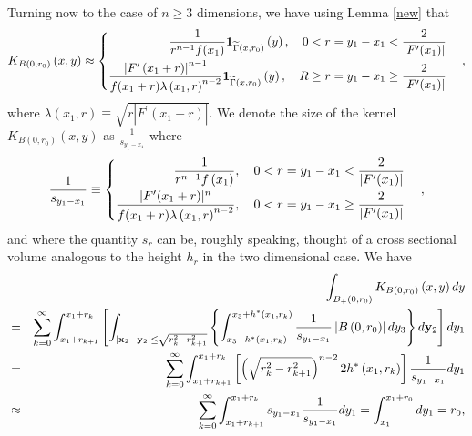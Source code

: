 \documentclass{amsart}
\theoremstyle{plain}
\numberwithin{equation}{section}
\begin{document}
Turning now to the case of $n\geq 3$ dimensions, we have using Lemma \ref{new}
that%
\begin{equation*}
K_{B\left( 0,r_{0}\right) }\left( x,y\right) \approx 
\begin{cases}
\begin{split}
\frac{1}{r^{n-1}f(x_{1})}\mathbf{1}_{\widetilde{\Gamma }\left(
	x,r_{0}\right) }\left( y\right) ,\quad 0& <r=y_{1}-x_{1}<\frac{2}{|F^{\prime
	}(x_{1})|} \\
\frac{\left\vert F^{\prime }\left( x_{1}+r\right) \right\vert ^{n-1}}{%
	f(x_{1}+r)\lambda \left( x_{1},r\right) ^{n-2}}\mathbf{1}_{\widetilde{\Gamma 
	}\left( x,r_{0}\right) }\left( y\right) ,\quad R& \geq r=y_{1}-x_{1}\geq 
\frac{2}{|F^{\prime }(x_{1})|}
\end{split}%
\end{cases}%
,
\end{equation*}%
where $\lambda \left( x_{1},r\right) \equiv \sqrt{r\left\vert F^{\prime
	}\left( x_{1}+r\right) \right\vert }$. We denote the size of the kernel $%
K_{B\left( 0,r_{0}\right) }(x,y)$ as $\frac{1}{s_{y_{1}-x_{1}}}$ where 
\begin{equation*}
\frac{1}{s_{y_{1}-x_{1}}}\equiv 
\begin{cases}
\begin{split}
\frac{1}{r^{n-1}f\left( x_{1}\right) },\quad 0& <r=y_{1}-x_{1}<\frac{2}{%
	|F^{\prime }(x_{1})|} \\
\frac{|F^{\prime }(x_{1}+r)|^{n}}{f(x_{1}+r)\lambda \left( x_{1},r\right)
	^{n-2}},\quad 0& <r=y_{1}-x_{1}\geq \frac{2}{|F^{\prime }(x_{1})|}
\end{split}%
\end{cases}%
,
\end{equation*}%
and where the quantity $s_{r}$ can be, roughly speaking, thought of a cross
sectional volume analogous to the height $h_{r}$ in the two dimensional
case. We have%
\begin{eqnarray*}
	&&\int_{B_{+}\left( 0,r_{0}\right) }K_{B\left( 0,r_{0}\right) }\left(
	x,y\right) dy \\
	&=&\sum_{k=0}^{\infty }\int_{x_{1}+r_{k+1}}^{x_{1}+r_{k}}\left[
	\int_{\left\vert \mathbf{x}_{2}-\mathbf{y}_{2}\right\vert \leq \sqrt{%
			r_{k}^{2}-r_{k+1}^{2}}}\left\{ \int_{x_{3}-h^{\ast }\left(
		x_{1},r_{k}\right) }^{x_{3}+h^{\ast }\left( x_{1},r_{k}\right) }\frac{1}{%
		s_{y_{1}-x_{1}}}\left\vert B\left( 0,r_{0}\right) \right\vert dy_{3}\right\}
	d\mathbf{y}_{2}\right] dy_{1} \\
	&=&\sum_{k=0}^{\infty }\int_{x_{1}+r_{k+1}}^{x_{1}+r_{k}}\left[ \left( \sqrt{%
		r_{k}^{2}-r_{k+1}^{2}}\right) ^{n-2}2h^{\ast }\left( x_{1},r_{k}\right) %
	\right] \frac{1}{s_{y_{1}-x_{1}}}dy_{1} \\
	&\approx &\sum_{k=0}^{\infty
	}\int_{x_{1}+r_{k+1}}^{x_{1}+r_{k}}s_{y_{1}-x_{1}}\frac{1}{s_{y_{1}-x_{1}}}%
	dy_{1}=\int_{x_{1}}^{x_{1}+r_{0}}dy_{1}=r_{0},
\end{eqnarray*}%
\end{document}
